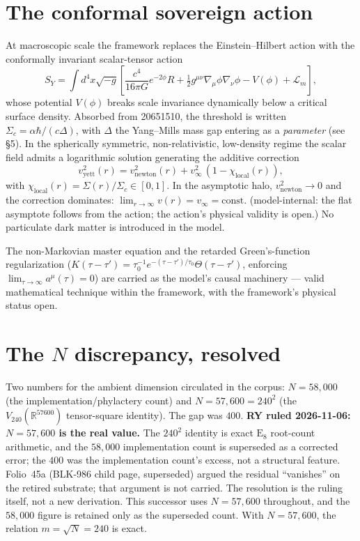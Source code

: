 \documentclass{alienfolio}
\begin{document}
\section{The conformal sovereign action}
At macroscopic scale the framework replaces the Einstein--Hilbert action with
the conformally invariant scalar-tensor action
\begin{equation}
S_Y = \int d^4x \sqrt{-g}\left[
\frac{c^4}{16\pi G} e^{-2\phi} R
+ \tfrac{1}{2} g^{\mu\nu}\nabla_\mu\phi\nabla_\nu\phi
- V(\phi) + \mathcal{L}_m \right],
\end{equation}
whose potential $V(\phi)$ breaks scale invariance dynamically below a
critical surface density. Absorbed from 20651510, the threshold is written
$\Sigma_c = \alpha\hbar/(c\Delta)$, with $\Delta$ the Yang--Mills mass gap
entering as a \emph{parameter} (see \S5). In the spherically symmetric,
non-relativistic, low-density regime the scalar field admits a logarithmic
solution generating the additive correction
\begin{equation}
v^2_{\mathrm{yett}}(r) = v^2_{\mathrm{newton}}(r)
+ v^2_\infty\,(1 - \chi_{\mathrm{local}}(r)),
\end{equation}
with $\chi_{\mathrm{local}}(r) = \Sigma(r)/\Sigma_c \in [0,1]$. In the
asymptotic halo, $v^2_{\mathrm{newton}} \to 0$ and the correction dominates:
$\lim_{r\to\infty} v(r) = v_\infty = \mathrm{const}$. 
(model-internal: the flat asymptote follows from the action; the action's
physical validity is open.) No particulate dark matter is introduced in the
model.

The non-Markovian master equation and the retarded Green's-function
regularization ($K(\tau-\tau') = \tau_0^{-1}
e^{-(\tau-\tau')/\tau_0}\Theta(\tau-\tau')$, enforcing
$\lim_{\tau\to\infty} a^\mu(\tau) = 0$) are carried as the model's causal
machinery --- valid mathematical technique within the framework, with the
framework's physical status open.

\section{The $N$ discrepancy, resolved}
Two numbers for the ambient dimension circulated in the corpus:
$N = 58{,}000$ (the implementation/phylactery count) and
$N = 57{,}600 = 240^2$ (the $V_{240}(\mathbb{R}^{57600})$ tensor-square
identity). The gap was $400$. \textbf{RY ruled 2026-11-06: $N = 57{,}600$ is the real value.} The $240^2$ identity is exact $\mathrm{E}_8$ root-count arithmetic, and the $58{,}000$ implementation count is superseded as a corrected error; the $400$ was the implementation count's excess, not a structural feature. Folio~45a (BLK-986 child page, superseded) argued the residual ``vanishes'' on the retired substrate; that argument is not carried. The resolution is the ruling itself, not a new derivation. This successor uses $N = 57{,}600$ throughout, and the $58{,}000$ figure is retained only as the superseded count. With $N = 57{,}600$, the relation $m = \sqrt{N} = 240$ is exact.
\end{document}
